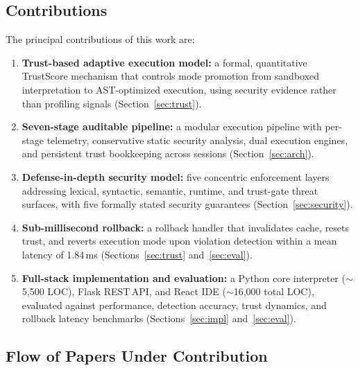 \documentclass[conference]{IEEEtran}
\begin{document}
\subsection*{Contributions}
The principal contributions of this work are:
\begin{enumerate}
  \item \textbf{Trust-based adaptive execution model:} a formal,
    quantitative TrustScore mechanism that controls mode promotion
    from sandboxed interpretation to AST-optimized execution, using
    security evidence rather than profiling signals
    (Section~\ref{sec:trust}).
  \item \textbf{Seven-stage auditable pipeline:} a modular execution
    pipeline with per-stage telemetry, conservative static security
    analysis, dual execution engines, and persistent trust bookkeeping
    across sessions (Section~\ref{sec:arch}).
  \item \textbf{Defense-in-depth security model:} five concentric
    enforcement layers addressing lexical, syntactic, semantic,
    runtime, and trust-gate threat surfaces, with five formally
    stated security guarantees (Section~\ref{sec:security}).
  \item \textbf{Sub-millisecond rollback:} a rollback handler that
    invalidates cache, resets trust, and reverts execution mode upon
    violation detection within a mean latency of 1.84\,ms
    (Sections~\ref{sec:trust} and~\ref{sec:eval}).
  \item \textbf{Full-stack implementation and evaluation:} a Python
    core interpreter ($\sim$5,500 LOC), Flask REST\,API, and React
    IDE ($\sim$16,000 total LOC), evaluated against performance,
    detection accuracy, trust
    dynamics, and rollback latency benchmarks
    (Sections~\ref{sec:impl} and~\ref{sec:eval}).
\end{enumerate}

\subsection*{Flow of Papers Under Contribution}
\end{document}
